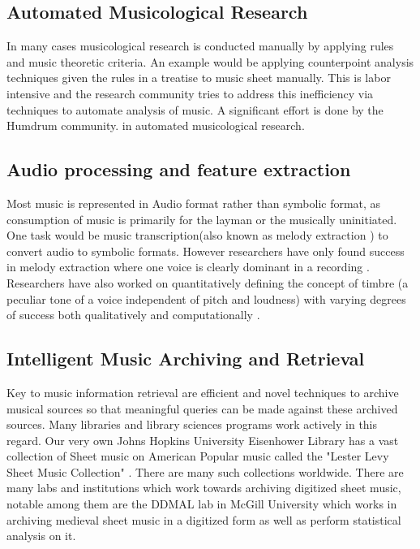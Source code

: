 \subsection{Automated Musicological Research}

\noindent In many cases musicological research is conducted manually by applying rules and music theoretic criteria. An example would be applying counterpoint analysis techniques given the rules in a treatise \cite{theorytreatise} to music sheet manually. This is labor intensive and the research community tries to address this inefficiency via techniques to automate analysis of music. A significant effort is done by the Humdrum community. \cite{humdrum} in automated musicological research. 

\subsection{Audio processing and feature extraction}

\noindent Most music is represented in Audio format rather than symbolic format, as consumption of music is primarily for the layman or the musically uninitiated. One task would be music transcription(also known as melody extraction \cite{melextract}) to convert audio to symbolic formats. However researchers have only found success in melody extraction where one voice is clearly dominant in a recording \cite{melextract}. Researchers have also worked on quantitatively defining the concept of timbre (a peculiar tone of a voice independent of pitch and loudness) with varying degrees of success both qualitatively \cite{timbrequal} and computationally \cite{musiclisteningthesis}. 

\subsection{Intelligent Music Archiving and Retrieval}

\noindent Key to music information retrieval are efficient and novel techniques to archive musical sources so that meaningful queries can be made against these archived sources. Many libraries and library sciences programs work actively in this regard. Our very own Johns Hopkins University Eisenhower Library has a vast collection of Sheet music on American Popular music called the "Lester Levy Sheet Music Collection" \cite{Levy:Collection:Online} . There are many such collections worldwide. There are many labs and institutions which work towards archiving digitized sheet music, notable among them are the DDMAL lab in McGill University \cite{DDMAL} which works in archiving medieval sheet music in a digitized form as well as perform statistical analysis on it. 

